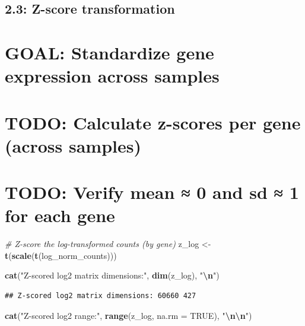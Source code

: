 \documentclass[
]{article}
\newenvironment{Shaded}{\begin{snugshade}}{\end{snugshade}}
\newcommand{\AttributeTok}[1]{\textcolor[rgb]{0.13,0.29,0.53}{#1}}
\newcommand{\CommentTok}[1]{\textcolor[rgb]{0.56,0.35,0.01}{\textit{#1}}}
\newcommand{\ConstantTok}[1]{\textcolor[rgb]{0.56,0.35,0.01}{#1}}
\newcommand{\FunctionTok}[1]{\textcolor[rgb]{0.13,0.29,0.53}{\textbf{#1}}}
\newcommand{\NormalTok}[1]{#1}
\newcommand{\OtherTok}[1]{\textcolor[rgb]{0.56,0.35,0.01}{#1}}
\newcommand{\SpecialCharTok}[1]{\textcolor[rgb]{0.81,0.36,0.00}{\textbf{#1}}}
\newcommand{\StringTok}[1]{\textcolor[rgb]{0.31,0.60,0.02}{#1}}
\begin{document}
\subsection{2.3: Z-score transformation}\label{z-score-transformation}

\section{GOAL: Standardize gene expression across
samples}\label{goal-standardize-gene-expression-across-samples}

\section{TODO: Calculate z-scores per gene (across
samples)}\label{todo-calculate-z-scores-per-gene-across-samples}

\section{TODO: Verify mean ≈ 0 and sd ≈ 1 for each
gene}\label{todo-verify-mean-0-and-sd-1-for-each-gene}

\begin{Shaded}
\begin{Highlighting}[]
\CommentTok{\# Z{-}score the log{-}transformed counts (by gene)}
\NormalTok{z\_log }\OtherTok{\textless{}{-}} \FunctionTok{t}\NormalTok{(}\FunctionTok{scale}\NormalTok{(}\FunctionTok{t}\NormalTok{(log\_norm\_counts)))}

\FunctionTok{cat}\NormalTok{(}\StringTok{"Z{-}scored log2 matrix dimensions:"}\NormalTok{, }\FunctionTok{dim}\NormalTok{(z\_log), }\StringTok{"}\SpecialCharTok{\textbackslash{}n}\StringTok{"}\NormalTok{)}
\end{Highlighting}
\end{Shaded}

\begin{verbatim}
## Z-scored log2 matrix dimensions: 60660 427
\end{verbatim}

\begin{Shaded}
\begin{Highlighting}[]
\FunctionTok{cat}\NormalTok{(}\StringTok{"Z{-}scored log2 range:"}\NormalTok{, }\FunctionTok{range}\NormalTok{(z\_log, }\AttributeTok{na.rm =} \ConstantTok{TRUE}\NormalTok{), }\StringTok{"}\SpecialCharTok{\textbackslash{}n\textbackslash{}n}\StringTok{"}\NormalTok{)}
\end{Highlighting}
\end{Shaded}
\end{document}
